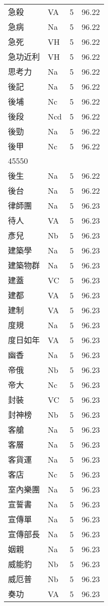 \documentclass[twocolumn]{book}
\begin{document}
\begin{supertabular}{llrr}
急殺 & VA & 5 &  96.22\\
急病 & Na & 5 &  96.22\\
急死 & VH & 5 &  96.22\\
急功近利 & VH & 5 &  96.22\\
思考力 & Na & 5 &  96.22\\
後記 & Na & 5 &  96.22\\
後埔 & Nc & 5 &  96.22\\
後段 & Ncd & 5 &  96.22\\
後勁 & Na & 5 &  96.22\\
後甲 & Nc & 5 &  96.22\\
45550\\
後生 & Na & 5 &  96.22\\
後台 & Na & 5 &  96.22\\
律師團 & Na & 5 &  96.23\\
待人 & VA & 5 &  96.23\\
彥兒 & Nb & 5 &  96.23\\
建築學 & Na & 5 &  96.23\\
建築物群 & Na & 5 &  96.23\\
建蓋 & VC & 5 &  96.23\\
建都 & VA & 5 &  96.23\\
建制 & VA & 5 &  96.23\\
度規 & Na & 5 &  96.23\\
度日如年 & VA & 5 &  96.23\\
幽香 & Na & 5 &  96.23\\
帝俄 & Nb & 5 &  96.23\\
帝大 & Nc & 5 &  96.23\\
封裝 & VC & 5 &  96.23\\
封神榜 & Nb & 5 &  96.23\\
客艙 & Na & 5 &  96.23\\
客層 & Na & 5 &  96.23\\
客貨運 & Na & 5 &  96.23\\
客店 & Nc & 5 &  96.23\\
室內樂團 & Na & 5 &  96.23\\
宣誓書 & Na & 5 &  96.23\\
宣傳單 & Na & 5 &  96.23\\
宣傳部長 & Na & 5 &  96.23\\
姻親 & Na & 5 &  96.23\\
威能豹 & Nb & 5 &  96.23\\
威厄普 & Nb & 5 &  96.23\\
奏功 & VA & 5 &  96.23\\

\end{supertabular}
\end{document}
